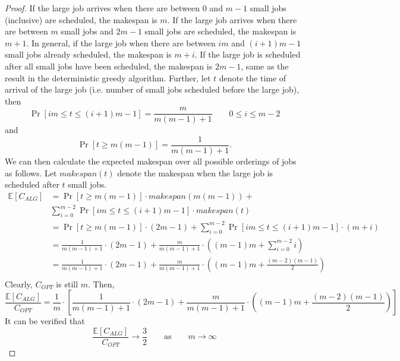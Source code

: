 \documentclass[11pt]{article}
\newcommand{\Exp}{\mathbb{E}}
\begin{document}
\begin{enumerate}[leftmargin=16pt]
\begin{enumerate}[leftmargin=16pt]
\begin{proof}
            If the large job arrives when there are between 0 and $m-1$ small jobs (inclusive) are scheduled, the makespan is $m$. If the large job arrives when there are between $m$ small jobs and $2m-1$ small jobs are scheduled, the makespan is $m+1$. In general, if the large job when there are between $im$ and $(i+1)m-1$ small jobs already scheduled, the makespan is $m+i$. If the large job is scheduled after all small jobs have been scheduled, the makespan is $2m-1$, same as the result in the deterministic greedy algorithm. Further, let $t$ denote the time of arrival of the large job (i.e. number of small jobs scheduled before the large job), then
            $$
            \Pr[im \leq t \leq (i+1)m-1] = \frac{m}{m(m-1)+1} \qquad 0 \leq i \leq m-2
            $$
            and
            $$
            \Pr[t \geq m(m-1)] = \frac{1}{m(m-1)+1}.
            $$
            We can then calculate the expected makespan over all possible orderings of jobs as follows. Let $\textit{makespan}(t)$ denote the makespan when the large job is scheduled after $t$ small jobs.
            $$
            \begin{aligned}
                \Exp[C_{ALG}] &= \Pr[t \geq m(m-1)] \cdot \textit{makespan}(m(m-1)) + \\
                & \sum_{i=0}^{m-2} \Pr[im \leq t \leq (i+1)m-1] \cdot \textit{makespan}(t) \\
                &= \Pr[t \geq m(m-1)] \cdot (2m-1) + \sum_{i=0}^{m-2} \Pr[im \leq t \leq (i+1)m-1] \cdot (m+i) \\
                &= \frac{1}{m(m-1)+1} \cdot (2m-1) + \frac{m}{m(m-1)+1} \cdot \left( (m-1)m + \sum_{i=0}^{m-2} i \right) \\
                &= \frac{1}{m(m-1)+1} \cdot (2m-1) + \frac{m}{m(m-1)+1} \cdot \left( (m-1)m + \frac{(m-2)(m-1)}{2} \right) \\
            \end{aligned}
            $$
            Clearly, $C_{OPT}$ is still $m$. Then,
            $$
            \frac{\Exp[C_{ALG}]}{C_{OPT}} = \frac{1}{m} \cdot \left[ \frac{1}{m(m-1)+1} \cdot (2m-1) + \frac{m}{m(m-1)+1} \cdot \left( (m-1)m + \frac{(m-2)(m-1)}{2} \right) \right]
            $$
            It can be verified that
            $$
            \frac{\Exp[C_{ALG}]}{C_{OPT}} \to \frac{3}{2} \qquad \text{as} \qquad m \to \infty
            $$
        \end{proof}


\end{enumerate}
\end{enumerate}
\end{document}
